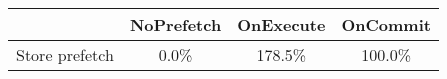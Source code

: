 \begin{tabular}{ l|ccc }
 & NoPrefetch & OnExecute & OnCommit\\ \hline
Store prefetch & 0.0\% & 178.5\% & 100.0\%\\ \hline
\end{tabular}

